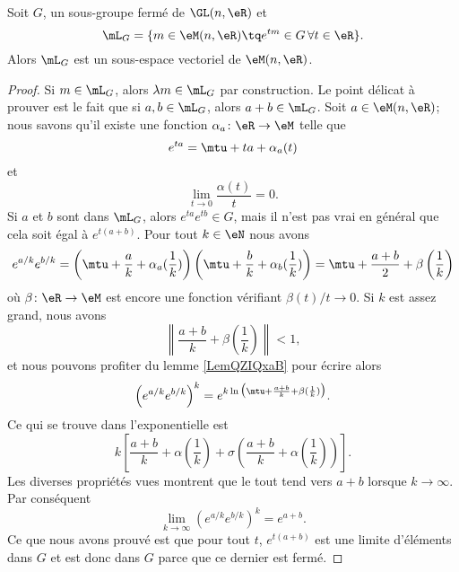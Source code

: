 \begin{lemma}
    Soit \( G\), un sous-groupe fermé de \( \GL(n,\eR)\) et 
    \begin{equation}
        \mL_G=\{ m\in \eM(n,\eR)\tq  e^{tm}\in G\,\forall t\in\eR \}.
    \end{equation}
    Alors \( \mL_G\) est un sous-espace vectoriel de \( \eM(n,\eR)\).
\end{lemma}

\begin{proof}
    Si \( m\in\mL_G\), alors \( \lambda m\in\mL_G\) par construction. Le point délicat à prouver est le fait que si \( a,b\in \mL_G\), alors \( a+b\in\mL_G\). Soit \( a\in \eM(n,\eR)\); nous savons qu'il existe une fonction \( \alpha_a\colon \eR\to \eM\) telle que
    \begin{equation}
        e^{ta}=\mtu+ta+\alpha_a(t)
    \end{equation}
    et 
    \begin{equation}
        \lim_{t\to 0} \frac{ \alpha(t) }{ t }=0.
    \end{equation}
    Si \( a\) et \( b\) sont dans \( \mL_G\), alors \(  e^{ta} e^{tb}\in G\), mais il n'est pas vrai en général que cela soit égal à \(  e^{t(a+b)}\). Pour tout \( k\in \eN\) nous avons
    \begin{equation}
        e^{a/k} e^{b/k}=\left( \mtu+\frac{ a }{ k }+\alpha_a(\frac{1}{ k }) \right)\left( \mtu+\frac{ b }{ k }+\alpha_b(\frac{1}{ k }) \right)=\mtu+\frac{ a+b }{2}+\beta\left( \frac{1}{ k } \right)
    \end{equation}
   où \( \beta\colon \eR\to \eM\) est encore une fonction vérifiant \( \beta(t)/t\to 0\). Si \( k\) est assez grand, nous avons
   \begin{equation}
       \left\| \frac{ a+b }{ k }+\beta(\frac{1}{ k })  \right\|<1,
   \end{equation}
   et nous pouvons profiter du lemme \ref{LemQZIQxaB} pour écrire alors
   \begin{equation}
       \left(  e^{a/k} e^{b/k} \right)^k= e^{k\ln\big(\mtu+\frac{ a+b }{ k }+\beta(\frac{1}{ k })\big)}.
   \end{equation}
   Ce qui se trouve dans l'exponentielle est
   \begin{equation}
       k\left[ \frac{ a+b }{ k }+\alpha( \frac{1}{ k })+\sigma\left( \frac{ a+b }{ k }+\alpha(\frac{1}{ k }) \right) \right].
   \end{equation}
   Les diverses propriétés vues montrent que le tout tend vers \( a+b\) lorsque \( k\to \infty\). Par conséquent
   \begin{equation}
       \lim_{k\to \infty} \left(  e^{a/k} e^{b/k} \right)^k= e^{a+b}.
   \end{equation}
   Ce que nous avons prouvé est que pour tout \( t\), \(  e^{t(a+b)}\) est une limite d'éléments dans \( G\) et est donc dans \( G\) parce que ce dernier est fermé.
\end{proof}

